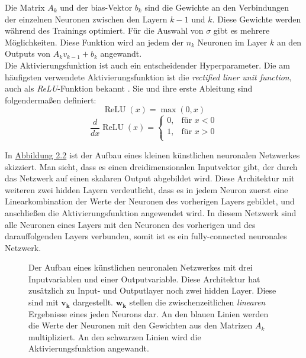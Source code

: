 Die Matrix $A_k$ und der bias-Vektor $b_k$ sind die Gewichte an den Verbindungen der einzelnen Neuronen zwischen den Layern $k-1$ und $k$.
Diese Gewichte werden w\"ahrend des Trainings optimiert. F\"ur die Auswahl von $\sigma$ gibt es mehrere M\"oglichkeiten. Diese Funktion wird an jedem der
$n_k$ Neuronen im Layer $k$ an den Outputs von $A_k v_{k-1} + b_k$ angewandt. \\

Die Aktivierungsfunktion ist auch ein entscheidender Hyperparameter. Die am h\"aufigsten verwendete Aktivierungsfunktion ist die \textit{rectified liner unit function},
auch als \textit{ReLU}-Funktion bekannt \cite{activation}. Sie und ihre erste Ableitung sind folgenderma{\ss}en definiert:
$$ \operatorname{ReLU}(x) = \max(0,x)$$
$$ \frac{d}{dx}\operatorname{ReLU}(x) =
	\left\{
	\begin{array}{lr}
		0, & \text{für }x < 0 \\
		1, & \text{für }x > 0 \\
	\end{array}
	\right.
$$


In \hyperref[fig:nn]{Abbildung 2.2} ist der Aufbau eines kleinen k\"unstlichen neuronalen Netzwerkes skizziert. Man sieht, dass es einen dreidimensionalen Inputvektor gibt, der
durch das Netzwerk auf einen skalaren Output abgebildet wird. Diese Architektur mit weiteren zwei hidden Layern verdeutlicht, dass es in jedem Neuron zuerst eine Linearkombination der
Werte der Neuronen des vorherigen Layers gebildet, und anschlie{\ss}en die Aktivierungsfunktion angewendet wird. In diesem Netzwerk sind alle Neuronen eines Layers mit den Neuronen
des vorherigen und des darauffolgenden Layers verbunden, somit ist es ein fully-connected neuronales Netzwerk. \\

\begin{figure}[ht]
	\label{fig:nn}
	\begin{center}
	\end{center}
	\caption[K\"unstliches Neuronales Netzwerk]
	{Der Aufbau eines k\"unstlichen neuronalen Netzwerkes mit drei Inputvariablen und einer Outputvariable. Diese Architektur hat zus\"atzlich zu Input- und Outputlayer
		noch zwei hidden Layer. Diese sind mit $\mathbf{v_k}$ dargestellt. $\mathbf{w_k}$ stellen die zwischenzeitlichen \textit{linearen} Ergebnisse eines jeden Neurons dar.
		An den blauen Linien werden die Werte der Neuronen mit den Gewichten aus den Matrizen $A_k$ multipliziert. An den schwarzen Linien wird die Aktivierungsfunktion angewandt.}
\end{figure}

